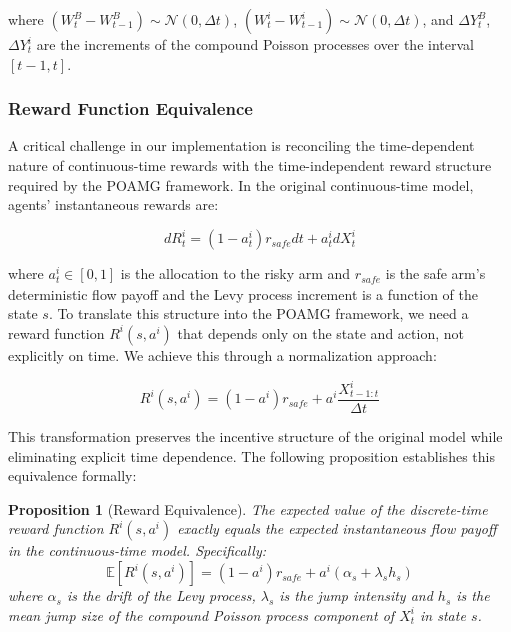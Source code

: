 \documentclass[a4paper,12pt]{report}
\newtheorem{proposition}{Proposition}
\begin{document}
where $(W^B_t - W^B_{t-1}) \sim \mathcal{N}(0, \Delta t)$, $(W^i_t - W^i_{t-1}) \sim \mathcal{N}(0, \Delta t)$, and $\Delta Y^B_t$, $\Delta Y^i_t$ are the increments of the compound Poisson processes over the interval $[t-1, t]$.

\subsubsection{Reward Function Equivalence}
\label{appendix:reward_equivalence}

A critical challenge in our implementation is reconciling the time-dependent nature of continuous-time rewards with the time-independent reward structure required by the POAMG framework. In the original continuous-time model, agents' instantaneous rewards are:

\begin{equation}
    dR^i_t = (1-a^i_t)r_\textit{safe} dt + a^i_t dX^i_t
\end{equation}

where $a^i_t \in [0,1]$ is the allocation to the risky arm and $r_\textit{safe}$ is the safe arm's deterministic flow payoff and the Levy process increment is a function of the state $s$. To translate this structure into the POAMG framework, we need a reward function $R^i(s, a^i)$ that depends only on the state and action, not explicitly on time. We achieve this through a normalization approach:

\begin{equation}
    R^i(s, a^i) = (1-a^i)r_\textit{safe} + a^i \frac{X^i_{t-1:t}}{\Delta t}
\end{equation}

This transformation preserves the incentive structure of the original model while eliminating explicit time dependence. The following proposition establishes this equivalence formally:

\begin{proposition}[Reward Equivalence]
    The expected value of the discrete-time reward function $R^i(s, a^i)$ exactly equals the expected instantaneous flow payoff in the continuous-time model. Specifically:
    \begin{equation}
        \mathbb{E}[R^i(s, a^i)] = (1-a^i)r_\textit{safe} + a^i(\alpha_s + \lambda_s h_s)
    \end{equation}
    where $\alpha_s$ is the drift of the Levy process, $\lambda_s$ is the jump intensity and $h_s$ is the mean jump size of the compound Poisson process component of $X^i_t$ in state $s$.
\end{proposition}
\end{document}

